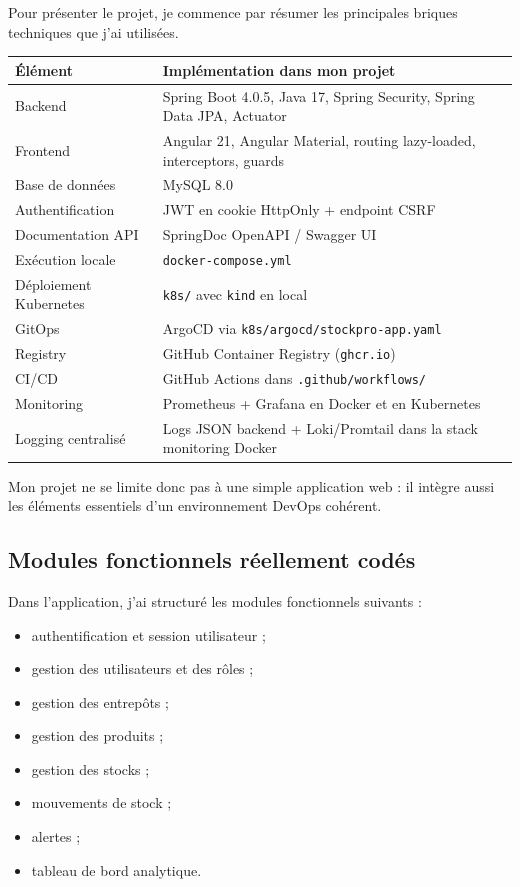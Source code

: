 \documentclass[10pt,a4paper]{article}
\begin{document}
Pour présenter le projet, je commence par résumer les principales briques techniques que j'ai utilisées.

\begin{longtable}{>{\raggedright\arraybackslash}p{} >{\raggedright\arraybackslash}p{}}
\toprule
\textbf{Élément} & \textbf{Implémentation dans mon projet} \\
\midrule
Backend & Spring Boot 4.0.5, Java 17, Spring Security, Spring Data JPA, Actuator \\
Frontend & Angular 21, Angular Material, routing lazy-loaded, interceptors, guards \\
Base de données & MySQL 8.0 \\
Authentification & JWT en cookie HttpOnly + endpoint CSRF \\
Documentation API & SpringDoc OpenAPI / Swagger UI \\
Exécution locale & \texttt{docker-compose.yml} \\
Déploiement Kubernetes & \texttt{k8s/} avec \texttt{kind} en local \\
GitOps & ArgoCD via \texttt{k8s/argocd/stockpro-app.yaml} \\
Registry & GitHub Container Registry (\texttt{ghcr.io}) \\
CI/CD & GitHub Actions dans \texttt{.github/workflows/} \\
Monitoring & Prometheus + Grafana en Docker et en Kubernetes \\
Logging centralisé & Logs JSON backend + Loki/Promtail dans la stack monitoring Docker \\
\bottomrule
\end{longtable}

Mon projet ne se limite donc pas à une simple application web : il intègre aussi les éléments essentiels d'un environnement DevOps cohérent.

\subsection{Modules fonctionnels réellement codés}

Dans l'application, j'ai structuré les modules fonctionnels suivants :

\begin{itemize}
\item authentification et session utilisateur ;
\item gestion des utilisateurs et des rôles ;
\item gestion des entrepôts ;
\item gestion des produits ;
\item gestion des stocks ;
\item mouvements de stock ;
\item alertes ;
\item tableau de bord analytique.
\end{itemize}
\end{document}
